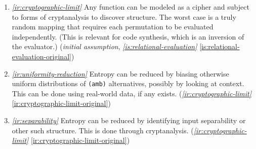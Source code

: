 \documentclass{report}
\makeatletter
\newcommand*{\Label}[2]{%
  \@bsphack
  \begingroup
    \label{#1-original}%
    \def\@currentlabel{#2}%
    \label{#1}%
  \endgroup
  \@esphack
}
\newcommand{\initial}{{\em initial assumption}}
\newcommand{\refboth}[1]{{\em \ref{#1}} \ref{#1-original}}
\makeatother
\begin{document}
\begin{enumerate}
\item{}\Label{ir:cryptographic-limit}{xhr.cryptographic}{\em\ref{ir:cryptographic-limit}}
  Any function can be modeled as a cipher and subject to forms of
  cryptanalysis to discover structure. The worst case is a truly random
  mapping that requires each permutation to be evaluated independently.
  (This is relevant for code synthesis, which is an inversion of the
  evaluator.)
(\initial, \refboth{is:relational-evaluation})
\item{}\Label{ir:uniformity-reduction}{xhr.uniformityreduction}{\em\ref{ir:uniformity-reduction}}
  Entropy can be reduced by biasing otherwise uniform distributions of
  \verb|(amb)| alternatives, possibly by looking at context. This can be
  done using real-world data, if any exists.
(\refboth{ir:cryptographic-limit})
\item{}\Label{ir:separability}{xhr.separability}{\em\ref{ir:separability}}
  Entropy can be reduced by identifying input separability or other such
  structure. This is done through cryptanalysis.
(\refboth{ir:cryptographic-limit})
\end{enumerate}
\end{document}
